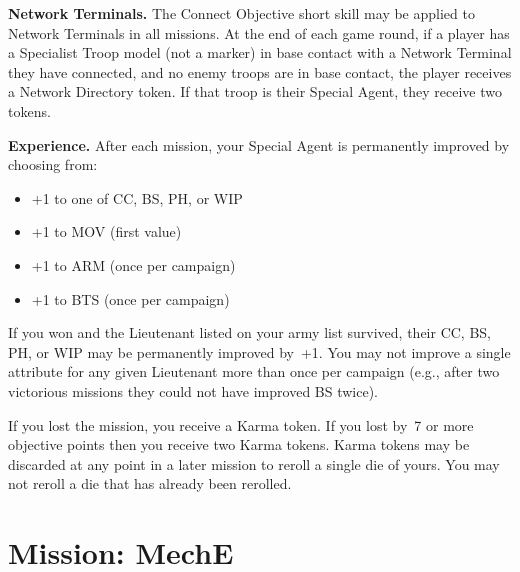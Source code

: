 \documentclass{tokh}
\newcommand{\missionrule}[1]{\noindent\textbf{#1}\xspace}
\begin{document}
\medskip
\missionrule{Network Terminals.}  The Connect Objective short skill
may be applied to Network Terminals in all missions.  At the end of
each game round, if a player has a Specialist Troop model (not a
marker) in base contact with a Network Terminal they have connected,
and no enemy troops are in base contact, the player receives a Network
Directory token.  If that troop is their Special Agent, they receive
two tokens.

\missionrule{Experience.}  After each mission, your Special Agent is
permanently improved by choosing from:

\begin{itemize}\shortlist
\item +1 to one of CC, BS, PH, or WIP
\item +1 to MOV (first value)
\item +1 to ARM (once per campaign)
\item +1 to BTS (once per campaign)
\end{itemize}

If you won and the Lieutenant listed on your army list survived, their
CC, BS, PH, or WIP may be permanently improved by~+1.  You may not
improve a single attribute for any given Lieutenant more than once per
campaign (e.g., after two victorious missions they could not have
improved BS twice).
  
If you lost the mission, you receive a Karma token.  If you lost by~7
or more objective points then you receive two Karma tokens.  Karma
tokens may be discarded at any point in a later mission to reroll a
single die of yours.  You may not reroll a die that has already been
rerolled.





\chapter{Mission: MechE}




\end{document}
